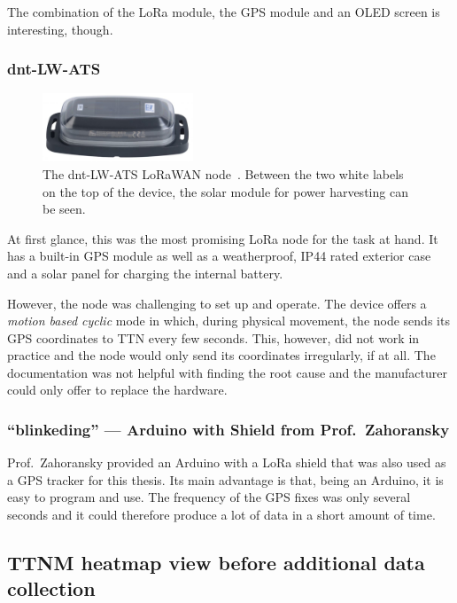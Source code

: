 The combination of the \ac{LoRa} module, the \ac{GPS} module and an \ac{OLED} screen is interesting, though.

\subsubsection{dnt-LW-ATS}

\begin{figure}[htbp]
    \centering
    \includegraphics[width=0.4\textwidth]{pictures/hardware/gps-nodes/dnt-LW-ATS.jpg}
    \caption{
        The dnt-LW-ATS \ac{LoRaWAN} node~\protect\cite{dnt_gmbh_dnt_nodate}.
        Between the two white labels on the top of the device, the solar module for power harvesting can be seen.
    }\label{pic:dnt-lw-ats}
\end{figure}

At first glance, this was the most promising \ac{LoRa} node for the task at hand.
It has a built-in \ac{GPS} module as well as a weatherproof, IP44 rated exterior case and a solar panel for charging the internal battery.

However, the node was challenging to set up and operate.
The device offers a \emph{motion based cyclic} mode in which, during physical movement, the node sends its \ac{GPS} coordinates to \ac{TTN} every few seconds.
This, however, did not work in practice and the node would only send its coordinates irregularly, if at all.
The documentation was not helpful with finding the root cause and the manufacturer could only offer to replace the hardware.

\subsubsection{``blinkeding'' --- Arduino with Shield from Prof.\ Zahoransky}

Prof.\ Zahoransky provided an Arduino with a \ac{LoRa} shield that was also used as a \ac{GPS} tracker for this thesis.
Its main advantage is that, being an Arduino, it is easy to program and use.
The frequency of the \ac{GPS} fixes was only several seconds and it could therefore produce a lot of data in a short amount of time.

\subsection{\acl{TTNM} heatmap view before additional data collection}

